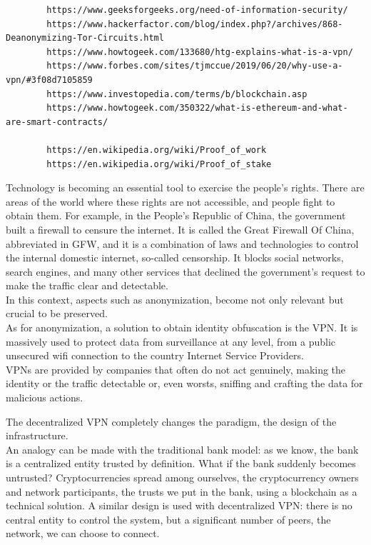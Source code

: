 \documentclass[12pt]{article}
\begin{document}
	\begin{verbatim}
		https://www.geeksforgeeks.org/need-of-information-security/
		https://www.hackerfactor.com/blog/index.php?/archives/868-Deanonymizing-Tor-Circuits.html
		https://www.howtogeek.com/133680/htg-explains-what-is-a-vpn/
		https://www.forbes.com/sites/tjmccue/2019/06/20/why-use-a-vpn/#3f08d7105859
		https://www.investopedia.com/terms/b/blockchain.asp
		https://www.howtogeek.com/350322/what-is-ethereum-and-what-are-smart-contracts/
		
		https://en.wikipedia.org/wiki/Proof_of_work
		https://en.wikipedia.org/wiki/Proof_of_stake
	\end{verbatim}

	Technology is becoming an essential tool to exercise the people's rights. There are areas of the world where these rights are not accessible, and people fight to obtain them. For example, in the People's Republic of China, the government built a firewall to censure the internet. It is called the Great Firewall Of China, abbreviated in GFW, and it is a combination of laws and technologies to control the internal domestic internet, so-called censorship. It blocks social networks, search engines, and many other services that declined the government's request to make the traffic clear and detectable.\\
	In this context, aspects such as anonymization, become not only relevant but crucial to be preserved.\\
	As for anonymization, a solution to obtain identity obfuscation is the VPN. It is massively used to protect data from surveillance at any level, from a public unsecured wifi connection to the country Internet Service Providers.\\VPNs are provided by companies that often do not act genuinely, making the identity or the traffic detectable or, even worsts, sniffing and crafting the data for malicious actions.\\
	\bigbreak

	The decentralized VPN completely changes the paradigm, the design of the infrastructure.\\
	An analogy can be made with the traditional bank model: as we know, the bank is a centralized entity trusted by definition. What if the bank suddenly becomes untrusted? Cryptocurrencies spread among ourselves, the cryptocurrency owners and network participants, the trusts we put in the bank, using a blockchain as a technical solution. 
	A similar design is used with decentralized VPN: there is no central entity to control the system, but a significant number of peers, the network, we can choose to connect.
\end{document}
